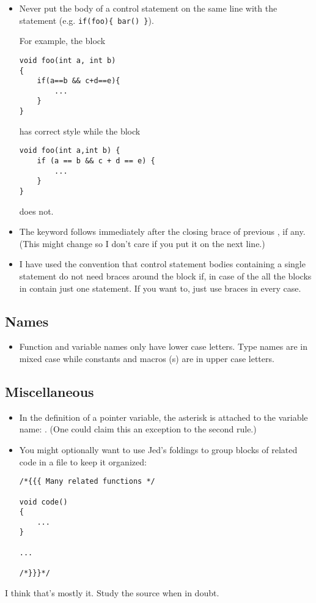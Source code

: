 \begin{itemize}
\item Never put the body of a control statement on the same line
    with the statement (e.g. \verb!if(foo){ bar() }!).

For example, the block
\begin{verbatim}    
void foo(int a, int b)
{
    if(a==b && c+d==e){
        ...
    }
}
\end{verbatim}

has correct style while the block

\begin{verbatim}   
void foo(int a,int b) {
    if (a == b && c + d == e) {
        ...
    }
}
\end{verbatim}

does not.

  \item The  keyword follows immediately after the closing brace of
    previous , if any. (This might change so I don't care if you put
    it on the next line.)
    
  \item I have used the convention that control statement bodies containing
    a single statement do not need braces around the block if, in case of
    the  all the blocks in  
    contain just one statement. If you want to, just use braces in every 
    case.
\end{itemize}

\subsection{Names}

\begin{itemize}
  \item Function and variable names only have lower case letters. Type
    names are in mixed case while constants and macros (s)
    are in upper case letters.
\end{itemize}

\subsection{Miscellaneous}

\begin{itemize}
  \item In the definition of a pointer variable, the asterisk is attached
    to the variable name: . (One could claim this an 
    exception to the second rule.)
    
  \item You might optionally want to use Jed's foldings to group blocks
    of related code in a file to keep it organized:

\begin{verbatim}    
/*{{{ Many related functions */
	
void code()
{
    ...	
}

...

/*}}}*/
\end{verbatim}
\end{itemize}

I think that's mostly it. Study the source when in doubt.
